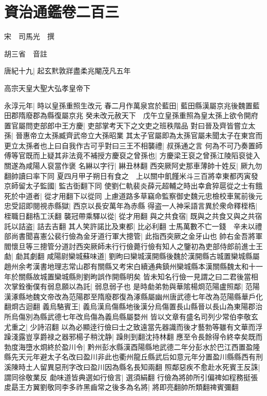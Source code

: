 \chapter{資治通鑑卷二百三}
宋　司馬光　撰

胡三省　音註

唐紀十九|{
	起玄黓敦牂盡柔兆閹茂凡五年}


高宗天皇大聖大弘孝皇帝下

永淳元年|{
	時以皇孫重照生改元}
春二月作萬泉宫於藍田|{
	藍田縣漢屬京兆後魏置藍田郡隋廢郡為縣復屬京兆}
癸未改元赦天下　戊午立皇孫重照為皇太孫上欲令開府置官屬問吏部郎中王方慶|{
	吏部掌考天下之文吏之班秩階品}
對曰晉及齊皆嘗立太孫|{
	晉惠帝立太孫臧齊武帝立大孫昭業}
其太子官屬即為太孫官屬未聞太子在東宫而更立太孫者也上曰自我作古可乎對曰三王不相襲禮|{
	叔孫通之言}
何為不可乃奏置師傅等官既而上疑其非法竟不補授方慶裒之曾孫也|{
	方慶梁王裒之曾孫江陵䧟裒徙入關遂為咸陽人裒當作褒}
名綝以字行|{
	綝丑林翻}
西突厥阿史那車薄帥十姓反|{
	厥九勿翻帥讀曰率下同}
夏四月甲子朔日有食之　上以關中飢饉米斗三百將幸東都丙寅發京師留太子監國|{
	監古衘翻下同}
使劉仁軌裴炎薛元超輔之時出幸倉猝扈從之士有餓死於中道者|{
	從才用翻下以從同}
上慮道路多草竊命監察御史魏元忠檢校車駕前後元忠受詔即閱視赤縣獄|{
	西京以長安萬年為赤縣}
得盗一人神采語言異於衆命釋桎梏|{
	桎職日翻梏工沃翻}
襲冠帶乘驛以從|{
	從才用翻}
與之共食宿|{
	既與之共食又與之共宿}
託以詰盗|{
	詰去吉翻}
其人笑許諾比及東都|{
	比必利翻}
士馬萬數不亡一錢　辛未以禮部尚書聞喜憲公裴行儉為金牙道行軍大摠管|{
	此指西突厥之金牙山也}
帥右金吾將軍閻懷旦等三摠管分道討西突厥師未行行儉薨行儉有知人之鑒初為吏部侍郎前進士王勮|{
	勮其劇翻}
咸陽尉欒城蘇味道|{
	劉昫曰欒城漢開縣後魏於漢開縣古城置欒城縣屬趙州余考漢書地理志常山郡有關縣又考宋白續通典鎮州欒城縣本漢關縣魏太和十一年於關縣故城置欒城縣則劉昫誤作開縣明矣}
皆未知名行儉一見謂之曰二君後當相次掌銓衡僕有弱息願以為託|{
	弱息弱子也}
是時勮弟勃與華隂楊烱范陽盧照鄰|{
	范陽漢涿縣地魏文帝改為范陽郡至隋廢郡復為涿縣屬幽州唐武德七年改為范陽縣華戶化翻烱古迴翻}
義烏駱賓王|{
	義烏漢烏傷縣地後漢分烏傷置長山縣晉以長山為東陽郡治所烏傷別為縣武德七年改烏傷為義烏縣屬婺州}
皆以文章有盛名司列少常伯李敬玄尤重之|{
	少詩沼翻}
以為必顯逹行儉曰士之致遠當先器識而後才藝勃等雖有文華而浮躁淺露豈享爵禄之器邪楊子稍沈静|{
	躁則到翻沈持林翻}
應至令長餘得令終幸矣既而勃度海墮水烱終於盈川令|{
	黔州彭水縣漢酉陽縣地武德二年分彭水於巴江西置盈隆縣先天元年避太子名改曰盈川非此也衢州龍丘縣武后如意元年分置盈川縣縣西有刑溪陳時土人留異惡刑字改曰盈川因為縣名長知兩翻}
照鄰惡疾不愈赴水死賓王反誅|{
	謂同徐敬業反}
勮味道皆典選如行儉言|{
	選須絹翻}
行儉為將帥所引偏禆如程務挺張䖍勗王方翼劉敬同李多祚黑齒常之後多為名將|{
	將即亮翻帥所類翻禆賓彌翻}
